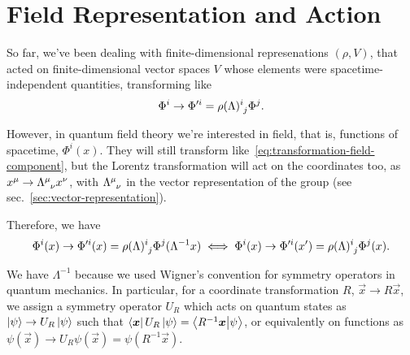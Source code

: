 \section{Field Representation and Action}
So far, we've been dealing with finite-dimensional represenations $(\rho,V)$, that acted on finite-dimensional vector spaces $V$ whose elements were spacetime-independent quantities, transforming like
\begin{equation}\label{eq:transformation-field-component}
   \Phi^i \to  \Phi'^i  =  \tensor{\rho(\Lambda)}{^i_j} \Phi^j.
\end{equation}

However, in quantum field theory we're interested in field, that is, functions of spacetime, $\Phi^i(x)$. They will still transform like~\eqref{eq:transformation-field-component}, but the Lorentz transformation will act on the coordinates too, as $x^\mu \to \tensor{\Lambda}{^\mu_\nu}x^\nu$, with $\tensor{\Lambda}{^\mu_\nu}$ in the vector representation of the group (see sec.~\ref{sec:vector-representation}).

Therefore, we have
\begin{equation}
   \Phi^i(x) \to \Phi'^i (x) = \tensor{\rho(\Lambda)}{^i_j} \Phi^j(\Lambda^{-1}x) \iff \Phi^i(x) \to \Phi'^i(x') = \tensor{\rho(\Lambda)}{^i_j} \Phi^j(x) .
\end{equation}

\begin{remark}
    We have $\Lambda^{-1}$ because we used Wigner's convention for symmetry operators in quantum mechanics. In particular, for a coordinate transformation $R$, $\vec{x} \to R \vec{x}$, we assign a symmetry operator $U_R$ which acts on quantum states as $\ket{\psi} \to U_R \ket{\psi}$ such that $\bra{\boldsymbol{x}}U_R\ket{\psi} = \braket{R^{-1}\boldsymbol{x}}{\psi}$, or equivalently on functions as $\psi(\vec{x})\to U_R \psi(\vec{x})=\psi(R^{-1}\vec{x})$.
\end{remark}

